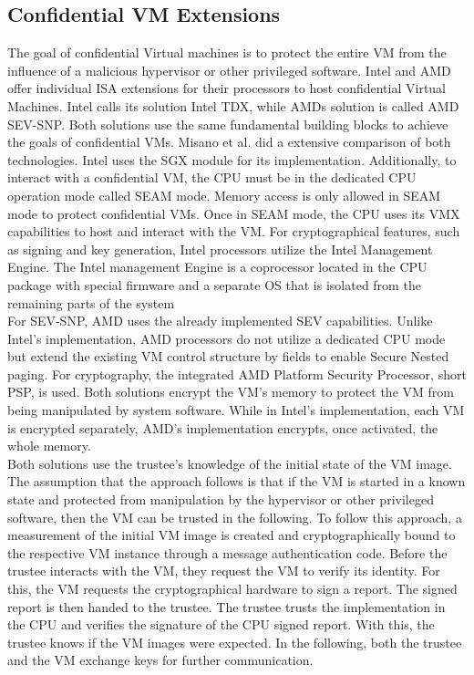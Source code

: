 \subsection{Confidential VM Extensions}
\label{section:20:confidential_vms}
The goal of confidential Virtual machines is to protect the entire VM from the
influence of a malicious hypervisor or other privileged software. Intel and
AMD offer individual ISA extensions for their processors to host confidential
Virtual Machines. Intel calls its solution Intel TDX, while AMDs solution is
called AMD SEV-SNP.\cite{tdx_whitepaper,kaplan_amd_2020} Both solutions use the
same fundamental building blocks to achieve the goals of confidential VMs.
Misano et al. did a extensive comparison of both
technologies.\cite{misono_confidential_2024} Intel uses the SGX module for its
implementation. Additionally, to interact with a confidential VM, the CPU must
be in the dedicated CPU operation mode called SEAM mode. Memory access is only
allowed in SEAM mode to protect confidential VMs. Once in SEAM mode, the CPU
uses its VMX capabilities to host and interact with the VM. For cryptographical
features, such as signing and key generation, Intel processors utilize the
Intel Management Engine. The Intel management Engine is a coprocessor located
in the CPU package with special firmware and a separate OS that is isolated from
the remaining parts of the system\\

For SEV-SNP, AMD uses the already implemented SEV capabilities. Unlike Intel's
implementation, AMD processors do not utilize a dedicated CPU mode but extend
the existing VM control structure by fields to enable Secure Nested paging. For
cryptography, the integrated AMD Platform Security Processor, short PSP, is
used. Both solutions encrypt the VM's memory to protect the VM from being
manipulated by system software. While in Intel's implementation, each VM is
encrypted separately, AMD's implementation encrypts, once activated, the whole
memory.\\

Both solutions use the trustee's knowledge of the initial state of the VM image.
The assumption that the approach follows is that if the VM is started in a known
state and protected from manipulation by the hypervisor or other privileged
software, then the VM can be trusted in the following. To follow this approach,
a measurement of the initial VM image is created and cryptographically bound to
the respective VM instance through a message authentication code. Before the
trustee interacts with the VM, they request the VM to verify its identity. For
this, the VM requests the cryptographical hardware to sign a report. The signed
report is then handed to the trustee. The trustee trusts the implementation in
the CPU and verifies the signature of the CPU signed report. With this, the
trustee knows if the VM images were expected. In the following, both the trustee
and the VM exchange keys for further communication.\\

